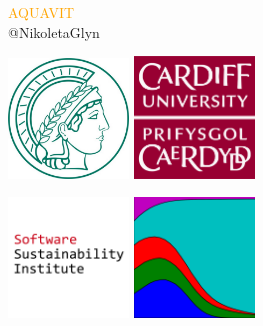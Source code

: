 \documentclass{beamer}
\begin{document}
\begin{frame}
    \begin{center}
        \Large{\textcolor{orange}{AQUAVIT}} \\

        \vspace{1cm}
        \normalsize{@NikoletaGlyn}

    \end{center}
\end{frame}

\begin{frame}
    \begin{center}
    \includegraphics[width=0.24\textwidth]{static/mpi.jpg}\hspace{8pt}
    \includegraphics[width=0.24\textwidth]{static/cardiff_uni_logo.jpg}\vspace{8pt}

    \includegraphics[width=0.24\textwidth]{static/ssi-logo.png}\hspace{8pt}
    \includegraphics[width=0.24\textwidth]{static/axelrod-logo.png}
    \end{center}
\end{frame}
\end{document}
